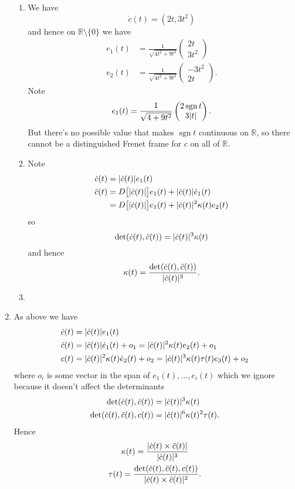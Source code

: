 \documentclass[a4paper, 12pt]{article}
\newcommand{\R}{\mathbb{R}}
\DeclarePairedDelimiter\abs{\lvert}{\rvert}
\DeclareMathOperator{\sgn}{sgn}
\let\dddot\relax
\begin{document}
\begin{enumerate}
\begin{enumerate}
\item We have
\[\dot c(t)=(2t,3t^2)\]
and hence on \(\R\setminus\{0\}\) we have
\begin{align*}
e_1(t)&=\frac1{\sqrt{4t^2+9t^4}}\begin{pmatrix}2t\\3t^2\end{pmatrix}\\
e_2(t)&=\frac1{\sqrt{4t^2+9t^4}}\begin{pmatrix}-3t^2\\2t\end{pmatrix}.
\end{align*}
Note
\[e_1(t)=\frac1{\sqrt{4+9t^2}}\begin{pmatrix}2\sgn t\\3\abs{t}\end{pmatrix}.\]
But there's no possible value that makes \(\sgn t\) continuous on \(\R\), so there cannot be a distinguished Frenet frame for \(c\) on all of \(\R\).

\item Note
\begin{align*}
\dot c(t)&=\abs{\dot c(t)}e_1(t)\\
\ddot c(t)&=D\big[\abs{\dot c(t)}\big]e_1(t)+\abs{\dot c(t)}\dot e_1(t)\\
&=D\big[\abs{\dot c(t)}\big]e_1(t)+\abs{\dot c(t)}^2\kappa(t)e_2(t)
\end{align*}
so
\[\det(\dot c(t),\ddot c(t))=\abs{\dot c(t)}^3\kappa(t)\]
and hence
\[\kappa(t)=\frac{\det(\dot c(t),\ddot c(t))}{\abs{\dot c(t)}^3}.\]

\item

\end{enumerate}

\item As above we have
\begin{align*}
\dot c(t)&=\abs{\dot c(t)}e_1(t)\\
\ddot c(t)&=\abs{\dot c(t)}\dot e_1(t)+o_1=\abs{\dot c(t)}^2\kappa(t)e_2(t)+o_1\\
\dddot c(t)&=\abs{\dot c(t)}^2\kappa(t)\dot e_2(t)+o_2=\abs{\dot c(t)}^3\kappa(t)\tau(t)e_3(t)+o_2
\end{align*}
where \(o_i\) is some vector in the span of \(e_1(t),\dots,e_i(t)\) which we ignore because it doesn't affect the determinants
\begin{align*}
\det(\dot c(t),\ddot c(t))&=\abs{\dot c(t)}^3\kappa(t)\\
\det(\dot c(t),\ddot c(t),\dddot c(t))&=\abs{\dot c(t)}^6\kappa(t)^2\tau(t).
\end{align*}
Hence
\begin{gather*}
\kappa(t)=\frac{\abs{\dot c(t)\times\ddot c(t)}}{\abs{\dot c(t)}^3}\\
\tau(t)=\frac{\det(\dot c(t),\ddot c(t),\dddot c(t))}{\abs{\dot c(t)\times\ddot c(t)}^2}.
\end{gather*}


\end{enumerate}
\end{document}
